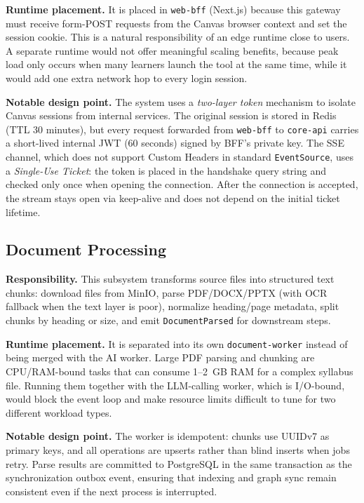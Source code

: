 \textbf{Runtime placement.} It is placed in \texttt{web-bff} (Next.js)
because this gateway must receive form-POST requests from the Canvas
browser context and set the session cookie. This is a natural
responsibility of an edge runtime close to users. A separate runtime would
not offer meaningful scaling benefits, because peak load only occurs when
many learners launch the tool at the same time, while it would add one
extra network hop to every login session.

\textbf{Notable design point.} The system uses a \emph{two-layer token}
mechanism to isolate Canvas sessions from internal services. The original
session is stored in Redis (TTL 30 minutes), but every request forwarded
from \texttt{web-bff} to \texttt{core-api} carries a short-lived internal
JWT (60 seconds) signed by BFF's private key. The SSE channel, which does
not support Custom Headers in standard \texttt{EventSource}, uses a
\emph{Single-Use Ticket}: the token is placed in the handshake query
string and checked only once when opening the connection. After the
connection is accepted, the stream stays open via keep-alive and does not
depend on the initial ticket lifetime.

\subsection{Document Processing}

\textbf{Responsibility.} This subsystem transforms source files into
structured text chunks: download files from MinIO, parse PDF/DOCX/PPTX
(with OCR fallback when the text layer is poor), normalize heading/page
metadata, split chunks by heading or size, and emit
\texttt{DocumentParsed} for downstream steps.

\textbf{Runtime placement.} It is separated into its own
\texttt{document-worker} instead of being merged with the AI worker. Large
PDF parsing and chunking are CPU/RAM-bound tasks that can consume
1--2~GB RAM for a complex syllabus file. Running them together with the
LLM-calling worker, which is I/O-bound, would block the event loop and
make resource limits difficult to tune for two different workload types.

\textbf{Notable design point.} The worker is idempotent: chunks use UUIDv7
as primary keys, and all operations are upserts rather than blind inserts
when jobs retry. Parse results are committed to PostgreSQL in the same
transaction as the synchronization outbox event, ensuring that indexing
and graph sync remain consistent even if the next process is interrupted.

